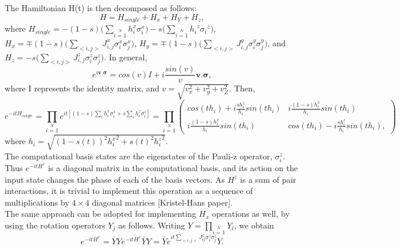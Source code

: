 \documentclass[../main.tex]{subfiles}
\begin{document}

The Hamiltonian H(t) is then decomposed as follows:
\begin{equation}
H=H_{single}+H_x+H_Y+H_z, \label{eq:b20}
\end{equation}
where $H_{single}=-(1-s)\Big(\sum \limits_{i=1}\limits^N h_i^x \sigma_i^x \Big)-s\Big(\sum\limits_{i=1}\limits^{N}{h_i}^z{\sigma_i}^z \Big)$, $H_x= \mp (1-s) \Big( \sum \limits_{<i,j>} J_{i,j}^x \sigma_{i}^x \sigma_{j}^x \Big)$, $H_y= \mp (1-s) \Big( \sum \limits_{<i,j>} J_{i,j}^y \sigma_{i}^y \sigma_{j}^y \Big)$, and $H_z= -s \Big(\sum \limits_{<i,j>} J_{i,j}^z \sigma_{i}^z\sigma_{j}^z\Big )$. In general, 
\begin{equation}
e^{i \mathbf{v.\sigma}}=cos(v) I +i \frac{sin(v)}{v}\mathbf{v.\sigma},
\end{equation}
where I represents the identity matrix, and $v=\sqrt{v_x^2 +v_y^2 +v_Z^2}$. Then, 
\begin{equation}
e^{-itH_{single}}=\prod \limits_{i=1} \limits^{N} e^{it[(1-s)\sum \limits_i h_i^x \sigma_i^x +s \sum \limits_{i} h_i^z \sigma_i^z]} = \prod \limits_{i=1} \limits^{N} \begin{pmatrix}
cos(th_i) +i \frac{sh_i^z}{h_i} sin(th_i) &  i \frac{(1-s)h_i^x}{h_i} sin(th_i)\\
i \frac{(1-s)h_i^x}{h_i}sin(th_i) & cos(th_i) -i \frac{sh_i^z}{h_i} sin(th_i),
\end{pmatrix}
\end{equation}
where $h_i=\sqrt{(1-s(t))^2 {h_i^x}^2 + s(t)^2 {h_i^z}^2}$.\\

The computational basis states are the eigenstates of the Pauli-z operator, $\sigma_i^z$. Thus $e^{-itH^z}$ is a diagonal matrix in the computational basis, and its action on the input state changes the phase of each of the basis vectors. As $H^z$ is a sum of pair interactions, it is trivial to implement this operation as a sequence of multiplications by $4 \times 4$ diagonal matrices [Kristel-Hans paper].\\

The same approach can be adopted for implementing $H_x$ operations as well, by using the rotation operators $Y_j$ as follows. Writing $Y=\prod \limits_{i=1} \limits^{N} Y_i$, we obtain
\begin{equation}
e^{-itH^x}=\bar{Y}Y e^{-itH^x}\bar{Y}Y=\bar{Y}e^{it \sum \limits_{<i,j>} J_{ij}^x \sigma_i^z \sigma_j^z} Y.
\end{equation}
\end{document}
